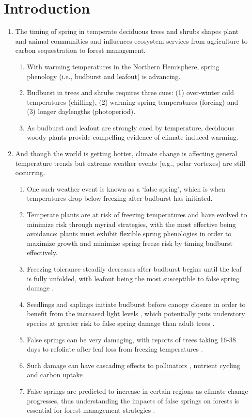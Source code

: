 \documentclass{article}\usepackage[]{graphicx}\usepackage[]{color}
\begin{document}
\section*{Introduction}
\begin{enumerate}
\item The timing of spring in temperate deciduous trees and shrubs shapes plant and animal communities and influences ecosystem services from agriculture to carbon sequestration to forest management.
  \begin{enumerate}
  \item With warming temperatures in the Northern Hemisphere, spring phenology (i.e., budburst and leafout) is advancing.
  \item Budburst in trees and shrubs requires three cues: (1) over-winter cold temperatures (chilling), (2) warming spring temperatures (forcing) and (3) longer daylengths (photoperiod).
  \item As budburst and leafout are strongly cued by temperature, deciduous woody plants provide compelling evidence of climate-induced warming.
  \end{enumerate}
  
\item And though the world is getting hotter, climate change is affecting general temperature trends but extreme weather events (e.g., polar vortexes) are still occurring. 
  \begin{enumerate}
  \item One such weather event is known as a `false spring', which is when temperatures drop below freezing after budburst has initiated.
  \item Temperate plants are at risk of freezing temperatures and have evolved to minimize risk through myriad strategies, with the most effective being avoidance: plants must exhibit flexible spring phenologies in order to maximize growth and minimize spring freeze risk by timing budburst effectively.
  \item Freezing tolerance steadily decreases after budburst begins until the leaf is fully unfolded, with leafout being the most susceptible to false spring damage \citep {Lenz2016}.
  \item Seedlings and saplings initiate budburst before canopy closure in order to benefit from the increased light levels \citep {Augspurger2008, Vitasse2013}, which potentially puts understory species at greater risk to false spring damage than adult trees \citep{Vitasse2014}.
  \item False springs can be very damaging, with reports of trees taking 16-38 days to refoliate after leaf loss from freezing temperatures \citep{Augspurger2009, Augspurger2013, Gu2008, Menzel2015}. 
  \item Such damage can have cascading effects to pollinators \citep{Boggs2012, Pardee2017}, nutrient cycling and carbon uptake \citep{Hufkens2012, Klosterman2018, Richardson2013}
  \item False springs are predicted to increase in certain regions as climate change progresses, thus understanding the impacts of false springs on forests is essential for forest management strategies \citep{OBrien2012}.
  \end{enumerate}
  

\end{enumerate}
\end{document}
